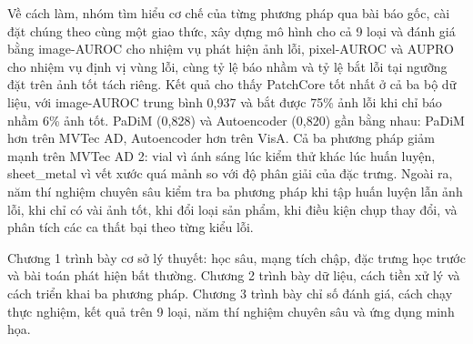 Về cách làm, nhóm tìm hiểu cơ chế của từng phương pháp qua bài báo gốc, cài đặt chúng theo cùng một giao thức, xây
dựng mô hình cho cả 9 loại và đánh giá bằng image-AUROC cho nhiệm vụ phát hiện ảnh lỗi, pixel-AUROC và AUPRO cho
nhiệm vụ định vị vùng lỗi, cùng tỷ lệ báo nhầm và tỷ lệ bắt lỗi tại ngưỡng đặt trên ảnh tốt tách riêng. Kết quả cho
thấy PatchCore tốt nhất ở cả ba bộ dữ liệu, với image-AUROC trung bình 0,937 và bắt được 75\% ảnh lỗi khi chỉ báo nhầm
6\% ảnh tốt. PaDiM (0,828) và Autoencoder (0,820) gần bằng nhau: PaDiM hơn trên MVTec AD, Autoencoder hơn trên VisA.
Cả ba phương pháp giảm mạnh trên MVTec AD 2: vial vì ánh sáng lúc kiểm thử khác lúc huấn luyện, sheet\_metal vì
vết xước quá mảnh so với độ phân giải của đặc trưng. Ngoài ra, năm thí
nghiệm chuyên sâu kiểm tra ba phương pháp khi tập huấn luyện lẫn ảnh lỗi, khi chỉ có vài ảnh tốt, khi đổi loại sản
phẩm, khi điều kiện chụp thay đổi, và phân tích các ca thất bại theo từng kiểu lỗi.

Chương 1 trình bày cơ sở lý thuyết: học sâu, mạng tích chập, đặc trưng học trước và bài toán phát hiện bất thường.
Chương 2 trình bày dữ liệu, cách tiền xử lý và cách triển khai ba phương pháp. Chương 3 trình bày chỉ số đánh giá,
cách chạy thực nghiệm, kết quả trên 9 loại, năm thí nghiệm chuyên sâu và ứng dụng minh họa.
